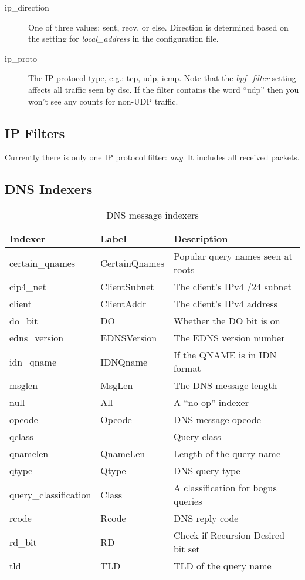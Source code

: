 \documentclass{report}
\def\dsc{{\sc dsc}}
\begin{document}
\begin{description}
\item[ip\_direction]
	One of three values: sent, recv, or else.  Direction is determined
	based on the setting for {\em local\_address\/} in the configuration file.
\item[ip\_proto]
	The IP protocol type, e.g.: tcp, udp, icmp.
	Note that the {\em bpf\_filter\/} setting affects all traffic
	seen by {\dsc}.  If the filter contains the word ``udp''
	then you won't see any counts for non-UDP traffic.
\end{description}

\subsection{IP Filters}

Currently there is only one IP protocol filter: {\em any\/}.
It includes all received packets.


\subsection{DNS Indexers}

\begin{table}
\begin{center}
\begin{tabular}{|lll|}
\hline
Indexer & Label & Description \\
\hline 
certain\_qnames & CertainQnames & Popular query names seen at roots \\
cip4\_net & ClientSubnet & The client's IPv4 /24 subnet \\
client & ClientAddr & The client's IPv4 address \\
do\_bit & DO & Whether the DO bit is on \\
edns\_version & EDNSVersion & The EDNS version number \\
idn\_qname & IDNQname & If the QNAME is in IDN format \\
msglen & MsgLen & The DNS message length \\
null & All & A ``no-op'' indexer \\
opcode & Opcode & DNS message opcode \\
qclass & - & Query class \\
qnamelen & QnameLen & Length of the query name \\
qtype & Qtype & DNS query type \\
query\_classification & Class & A classification for bogus queries \\
rcode & Rcode & DNS reply code \\
rd\_bit & RD & Check if Recursion Desired bit set \\
tld & TLD & TLD of the query name \\
\hline
\end{tabular}
\caption{\label{tbl-dns-indexers}DNS message indexers}
\end{center}
\end{table}
\end{document}

